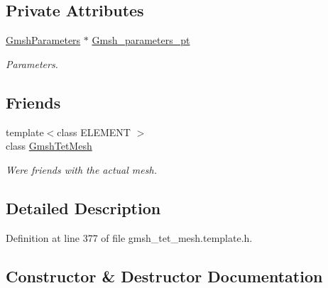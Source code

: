 \subsection*{Private Attributes}
\begin{DoxyCompactItemize}
\item 
\hyperlink{classoomph_1_1GmshParameters}{Gmsh\+Parameters} $\ast$ \hyperlink{classoomph_1_1GmshTetScaffoldMesh_afce3676b4f42501024ba1a933f04600d}{Gmsh\+\_\+parameters\+\_\+pt}
\begin{DoxyCompactList}\small\item\em Parameters. \end{DoxyCompactList}\end{DoxyCompactItemize}
\subsection*{Friends}
\begin{DoxyCompactItemize}
\item 
{\footnotesize template$<$class E\+L\+E\+M\+E\+NT $>$ }\\class \hyperlink{classoomph_1_1GmshTetScaffoldMesh_a542660fc34eb890a935f0d42a3b4eb8a}{Gmsh\+Tet\+Mesh}
\begin{DoxyCompactList}\small\item\em We\textquotesingle{}re friends with the actual mesh. \end{DoxyCompactList}\end{DoxyCompactItemize}


\subsection{Detailed Description}


Definition at line 377 of file gmsh\+\_\+tet\+\_\+mesh.\+template.\+h.



\subsection{Constructor \& Destructor Documentation}
\mbox{\label{classoomph_1_1GmshTetScaffoldMesh_a16430cc97edb1f4ec0eab6cfa5b94563}} 
